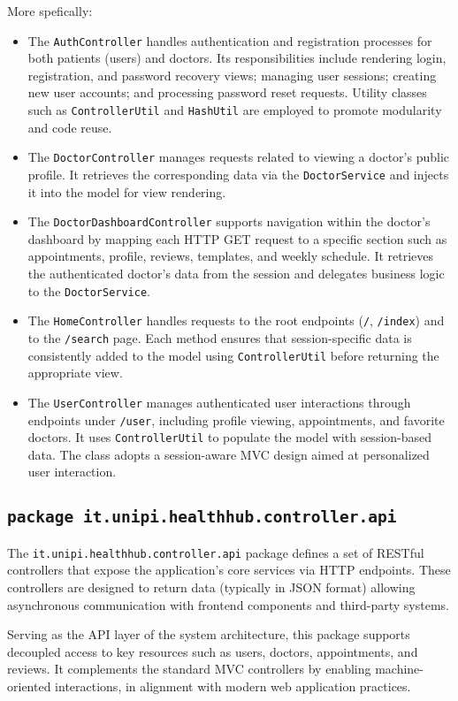 More spefically:
\begin{itemize}
	\item The \texttt{AuthController} handles authentication and registration processes for both patients (users) and doctors. Its responsibilities include rendering login, registration, and password recovery views; managing user sessions; creating new user accounts; and processing password reset requests. Utility classes such as \texttt{ControllerUtil} and \texttt{HashUtil} are employed to promote modularity and code reuse.
	\item The \texttt{DoctorController} manages requests related to viewing a doctor’s public profile. It retrieves the corresponding data via the \texttt{DoctorService} and injects it into the model for view rendering.
	\item The \texttt{DoctorDashboardController} supports navigation within the doctor's dashboard by mapping each HTTP GET request to a specific section such as appointments, profile, reviews, templates, and weekly schedule. It retrieves the authenticated doctor's data from the session and delegates business logic to the \texttt{DoctorService}.
	\item The \texttt{HomeController} handles requests to the root endpoints (\texttt{/}, \texttt{/index}) and to the \texttt{/search} page. Each method ensures that session-specific data is consistently added to the model using \texttt{ControllerUtil} before returning the appropriate view.
	\item The \texttt{UserController} manages authenticated user interactions through endpoints under \texttt{/user}, including profile viewing, appointments, and favorite doctors. It uses \texttt{ControllerUtil} to populate the model with session-based data. The class adopts a session-aware MVC design aimed at personalized user interaction.
\end{itemize}

\subsection{\texttt{package it.unipi.healthhub.controller.api}}
The \texttt{it.unipi.healthhub.controller.api} package defines a set of RESTful controllers that expose the application's core services via HTTP endpoints. These controllers are designed to return data (typically in JSON format) allowing asynchronous communication with frontend components and third-party systems.

Serving as the API layer of the system architecture, this package supports decoupled access to key resources such as users, doctors, appointments, and reviews. It complements the standard MVC controllers by enabling machine-oriented interactions, in alignment with modern web application practices.

